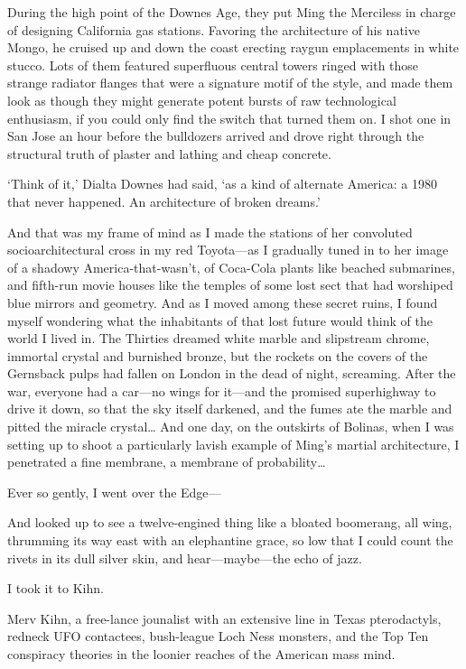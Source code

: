 During the high point of the Downes Age, they put Ming the Merciless in charge of designing California gas stations. Favoring the architecture of his native Mongo, he cruised up and down the coast erecting raygun emplacements in white stucco. Lots of them featured superfluous central towers ringed with those strange radiator flanges that were a signature motif of the style, and made them look as though they might generate potent bursts of raw technological enthusiasm, if you could only find the switch that turned them on. I shot one in San Jose an hour before the bulldozers arrived and drove right through the structural truth of plaster and lathing and cheap concrete.

`Think of it,' Dialta Downes had said, `as a kind of alternate America: a 1980 that never happened. An architecture of broken dreams.'

And that was my frame of mind as I made the stations of her convoluted socioarchitectural cross in my red Toyota—as I gradually tuned in to her image of a shadowy America-that-wasn't, of Coca-Cola plants like beached submarines, and fifth-run movie houses like the temples of some lost sect that had worshiped blue mirrors and geometry. And as I moved among these secret ruins, I found myself wondering what the inhabitants of that lost future would think of the world I lived in. The Thirties dreamed white marble and slipstream chrome, immortal crystal and burnished bronze, but the rockets on the covers of the Gernsback pulps had fallen on London in the dead of night, screaming. After the war, everyone had a car—no wings for it—and the promised superhighway to drive it down, so that the sky itself darkened, and the fumes ate the marble and pitted the miracle crystal…
And one day, on the outskirts of Bolinas, when I was setting up to shoot a particularly lavish example of Ming's martial architecture, I penetrated a fine membrane, a membrane of probability…

Ever so gently, I went over the Edge—

And looked up to see a twelve-engined thing like a bloated boomerang, all wing, thrumming its way east with an elephantine grace, so low that I could count the rivets in its dull silver skin, and hear—maybe—the echo of jazz.

I took it to Kihn.

Merv Kihn, a free-lance jounalist with an extensive line in Texas pterodactyls, redneck UFO contactees, bush-league Loch Ness monsters, and the Top Ten conspiracy theories in the loonier reaches of the American mass mind.

